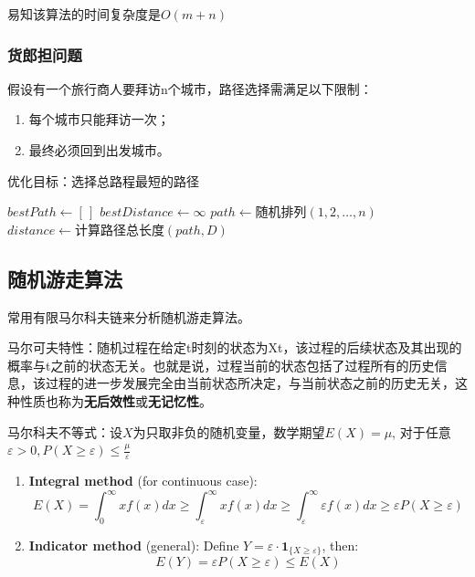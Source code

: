 \documentclass[./../main.tex]{subfiles} %
\begin{document}
易知该算法的时间复杂度是$O(m+n)$

\subsubsection{货郎担问题}
假设有一个旅行商人要拜访n个城市，路径选择需满足以下限制：
\begin{enumerate}
    \item 每个城市只能拜访一次；
    \item 最终必须回到出发城市。
\end{enumerate}

​优化目标​：选择总路程最短的路径

\begin{algorithm}[H]
\SetAlgoLined
{}
\BlankLine
$bestPath \leftarrow [\,]$ 
$bestDistance \leftarrow \infty$
$path \leftarrow \text{随机排列}(1, 2, \dots, n)$ 
$distance \leftarrow \text{计算路径总长度}(path, D)$ 
\BlankLine
{}
 
\caption{随机采样求解TSP算法 (RandomTSP)}
\end{algorithm}

\subsection{随机游走算法}
常用有限马尔科夫链来分析随机游走算法。

马尔可夫特性：随机过程在给定t时刻的状态为Xt，该过程的后续状态及其出现的概率与t之前的状态无关。也就是说，过程当前的状态包括了过程所有的历史信息，该过程的进一步发展完全由当前状态所决定，与当前状态之前的历史无关，这种性质也称为\textbf{无后效性}或\textbf{无记忆性}。

马尔科夫不等式：设$X$为只取非负的随机变量，数学期望$E(X)=\mu$, 对于任意$\varepsilon>0, P(X\geq\varepsilon)\le\frac{\mu}{\varepsilon}$

\begin{enumerate}
    \item \textbf{Integral method} (for continuous case):
    $$
    E(X) = \int_0^\infty x f(x)dx \geq \int_\varepsilon^\infty x f(x)dx \geq \int_\varepsilon^\infty \varepsilon f(x)dx \ge \varepsilon P(X \geq \varepsilon)
    $$
    
    \item \textbf{Indicator method} (general):
    Define $Y = \varepsilon \cdot \mathbf{1}_{\{X \geq \varepsilon\}}$, then:
    $$
    E(Y) = \varepsilon P(X \geq \varepsilon) \leq E(X)
    $$
\end{enumerate}
\end{document}
